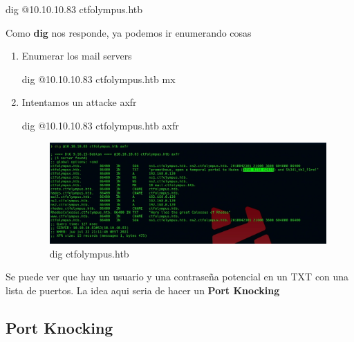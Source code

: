 \documentclass{assets/ipesethesis}
\newenvironment{Shaded}{\begin{snugshade}}{\end{snugshade}}
\newcommand{\ExtensionTok}[1]{#1}
\newcommand{\NormalTok}[1]{#1}
\begin{document}
\begin{Shaded}
\begin{Highlighting}[]
\ExtensionTok{dig}\NormalTok{ @10.10.10.83 ctfolympus.htb}
\end{Highlighting}
\end{Shaded}

Como \textbf{dig} nos responde, ya podemos ir enumerando cosas

\begin{enumerate}
\def\labelenumi{\arabic{enumi}.}
\item
  Enumerar los mail servers

\begin{Shaded}
\begin{Highlighting}[]
\ExtensionTok{dig}\NormalTok{ @10.10.10.83 ctfolympus.htb mx}
\end{Highlighting}
\end{Shaded}
\item
  Intentamos un attacke axfr

\begin{Shaded}
\begin{Highlighting}[]
\ExtensionTok{dig}\NormalTok{ @10.10.10.83 ctfolympus.htb axfr}
\end{Highlighting}
\end{Shaded}

  \begin{figure}
   \includegraphics[width=0.9\linewidth]{images/dig-ctfolympus} \caption{dig ctfolympus.htb}\label{fig:unnamed-chunk-4}
   \end{figure}
\end{enumerate}

Se puede ver que hay un usuario y una contraseña potencial en un TXT con una lista de puertos.
La idea aqui seria de hacer un \textbf{Port Knocking}

\hypertarget{port-knocking}{%
\subsection*{Port Knocking}\label{port-knocking}}
\end{document}
